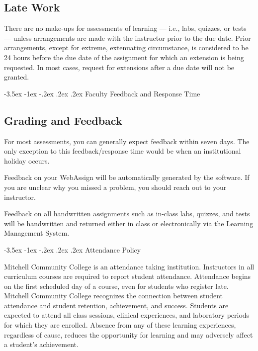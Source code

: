 \documentclass{article}
\makeatletter
\renewcommand\section{\@startsection{section}{1}{0pt}%
  {-3.5ex \@plus -1ex \@minus -.2ex}%
  {.2ex \@plus.2ex}%
  {\normalfont\Large\bfseries}} %
\makeatother
\begin{document}
\subsection{Late Work}

There are no make-ups for assessments of learning --- i.e., labs, quizzes, or tests --- unless arrangements are made with the instructor prior to the due date. Prior arrangements, except for extreme, extenuating circumstance, is considered to be 24 hours before the due date of the assignment for which an extension is being requested. In most cases, request for extensions after a due date will not be granted.

\section{Faculty Feedback and Response Time}

\subsection{Grading and Feedback}

For most assessments, you can generally expect feedback within seven days. The only exception to this feedback/response time would be when an institutional holiday occurs.

Feedback on your WebAssign will be automatically generated by the software. If you are unclear why you missed a problem, you should reach out to your instructor.

Feedback on all handwritten assignments such as in-class labs, quizzes, and tests will be handwritten and returned either in class or electronically via the Learning Management System.

\section{Attendance Policy}

Mitchell Community College is an attendance taking institution. Instructors in all curriculum courses are required to report student attendance. Attendance begins on the first scheduled day of a course, even for students who register late. Mitchell Community College recognizes the connection between student attendance and student retention, achievement, and success. Students are expected to attend all class sessions, clinical experiences, and laboratory periods for which they are enrolled. Absence from any of these learning experiences, regardless of cause, reduces the opportunity for learning and may adversely affect a student's achievement.
\end{document}
